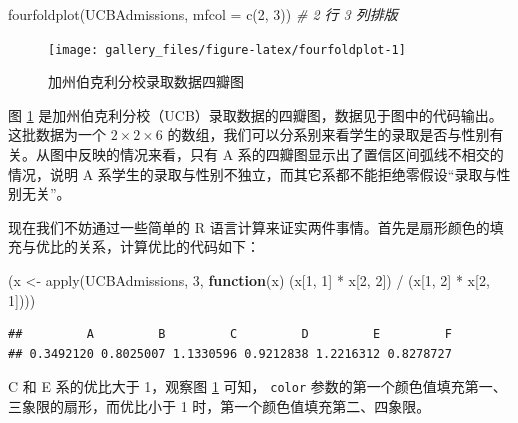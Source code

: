 \documentclass[
  b5paper,
  UTF8,twoside]{book}
\newenvironment{Shaded}{\begin{snugshade}}{\end{snugshade}}
\newcommand{\AttributeTok}[1]{\textcolor[rgb]{0.77,0.63,0.00}{#1}}
\newcommand{\CommentTok}[1]{\textcolor[rgb]{0.56,0.35,0.01}{\textit{#1}}}
\newcommand{\ControlFlowTok}[1]{\textcolor[rgb]{0.13,0.29,0.53}{\textbf{#1}}}
\newcommand{\DecValTok}[1]{\textcolor[rgb]{0.00,0.00,0.81}{#1}}
\newcommand{\FunctionTok}[1]{\textcolor[rgb]{0.00,0.00,0.00}{#1}}
\newcommand{\NormalTok}[1]{#1}
\newcommand{\OtherTok}[1]{\textcolor[rgb]{0.56,0.35,0.01}{#1}}
\newcommand{\SpecialCharTok}[1]{\textcolor[rgb]{0.00,0.00,0.00}{#1}}
\begin{document}
\begin{Shaded}
\begin{Highlighting}[]
\FunctionTok{fourfoldplot}\NormalTok{(UCBAdmissions, }\AttributeTok{mfcol =} \FunctionTok{c}\NormalTok{(}\DecValTok{2}\NormalTok{, }\DecValTok{3}\NormalTok{)) }\CommentTok{\# 2 行 3 列排版}
\end{Highlighting}
\end{Shaded}

\begin{figure}

{\centering \texttt{[image: gallery\_files/figure-latex/fourfoldplot-1]} 

}

\caption[加州伯克利分校录取数据四瓣图]{加州伯克利分校录取数据四瓣图}\label{fig:fourfoldplot}
\end{figure}

图 \ref{fig:fourfoldplot} 是加州伯克利分校（UCB）录取数据的四瓣图，数据见于图中的代码输出。这批数据为一个 \(2\times2\times6\) 的数组，我们可以分系别来看学生的录取是否与性别有关。从图中反映的情况来看，只有 A 系的四瓣图显示出了置信区间弧线不相交的情况，说明 A 系学生的录取与性别不独立，而其它系都不能拒绝零假设``录取与性别无关''。

现在我们不妨通过一些简单的 R 语言计算来证实两件事情。首先是扇形颜色的填充与优比的关系，计算优比的代码如下：

\begin{Shaded}
\begin{Highlighting}[]
\NormalTok{(x }\OtherTok{\textless{}{-}} \FunctionTok{apply}\NormalTok{(UCBAdmissions, }\DecValTok{3}\NormalTok{, }\ControlFlowTok{function}\NormalTok{(x) (x[}\DecValTok{1}\NormalTok{, }\DecValTok{1}\NormalTok{] }\SpecialCharTok{*}\NormalTok{ x[}\DecValTok{2}\NormalTok{, }\DecValTok{2}\NormalTok{]) }\SpecialCharTok{/}\NormalTok{ (x[}\DecValTok{1}\NormalTok{, }\DecValTok{2}\NormalTok{] }\SpecialCharTok{*}\NormalTok{ x[}\DecValTok{2}\NormalTok{, }\DecValTok{1}\NormalTok{])))}
\end{Highlighting}
\end{Shaded}

\begin{verbatim}
##         A         B         C         D         E         F 
## 0.3492120 0.8025007 1.1330596 0.9212838 1.2216312 0.8278727
\end{verbatim}

C 和 E 系的优比大于 1，观察图 \ref{fig:fourfoldplot} 可知， \texttt{color} 参数的第一个颜色值填充第一、三象限的扇形，而优比小于 1 时，第一个颜色值填充第二、四象限。
\end{document}
